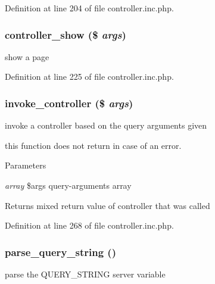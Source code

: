 Definition at line 204 of file controller.inc.php.

\hypertarget{controller_8inc_8php_ad135971740244b9e81718d4cd0407b11}{
\subsubsection[{controller\_\-show}]{\setlength{\rightskip}{0pt plus 5cm}controller\_\-show (\$ {\em args})}}
\label{controller_8inc_8php_ad135971740244b9e81718d4cd0407b11}
show a page 

Definition at line 225 of file controller.inc.php.

\hypertarget{controller_8inc_8php_a170bef82dc4636c51b678276323e4ff4}{
\subsubsection[{invoke\_\-controller}]{\setlength{\rightskip}{0pt plus 5cm}invoke\_\-controller (\$ {\em args})}}
\label{controller_8inc_8php_a170bef82dc4636c51b678276323e4ff4}
invoke a controller based on the query arguments given

this function does not return in case of an error. 
\begin{DoxyParams}{Parameters}
\item[{\em array}]\$args query-\/arguments array \end{DoxyParams}
\begin{DoxyReturn}{Returns}
mixed return value of controller that was called 
\end{DoxyReturn}


Definition at line 268 of file controller.inc.php.

\hypertarget{controller_8inc_8php_a51a50fbc5165b4ff0a289b2010bb7597}{
\subsubsection[{parse\_\-query\_\-string}]{\setlength{\rightskip}{0pt plus 5cm}parse\_\-query\_\-string ()}}
\label{controller_8inc_8php_a51a50fbc5165b4ff0a289b2010bb7597}
parse the QUERY\_\-STRING server variable

